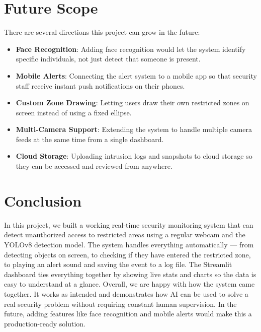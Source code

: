 \documentclass[12pt,a4paper]{article}
\begin{document}
\section{Future Scope}
There are several directions this project can grow in the future:
\begin{itemize}
    \item \textbf{Face Recognition}: Adding face recognition would let the system identify specific individuals, not just detect that someone is present.
    \item \textbf{Mobile Alerts}: Connecting the alert system to a mobile app so that security staff receive instant push notifications on their phones.
    \item \textbf{Custom Zone Drawing}: Letting users draw their own restricted zones on screen instead of using a fixed ellipse.
    \item \textbf{Multi-Camera Support}: Extending the system to handle multiple camera feeds at the same time from a single dashboard.
    \item \textbf{Cloud Storage}: Uploading intrusion logs and snapshots to cloud storage so they can be accessed and reviewed from anywhere.
\end{itemize}

\section{Conclusion}
In this project, we built a working real-time security monitoring system that can detect unauthorized access to restricted areas using a regular webcam and the YOLOv8 detection model. The system handles everything automatically --- from detecting objects on screen, to checking if they have entered the restricted zone, to playing an alert sound and saving the event to a log file. The Streamlit dashboard ties everything together by showing live stats and charts so the data is easy to understand at a glance. Overall, we are happy with how the system came together. It works as intended and demonstrates how AI can be used to solve a real security problem without requiring constant human supervision. In the future, adding features like face recognition and mobile alerts would make this a production-ready solution.
\end{document}
